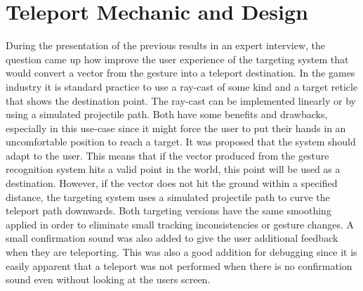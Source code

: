 
\section{Teleport Mechanic and Design}
During the presentation of the previous results in an expert interview, the question came up how improve the user experience of the targeting system that would convert a vector from the gesture into a teleport destination. In the games industry it is standard practice to use a ray-cast of some kind and a target reticle that shows the destination point. The ray-cast can be implemented linearly or by using a simulated projectile path. Both have some benefits and drawbacks, especially in this use-case since it might force the user to put their hands in an uncomfortable position to reach a target. It was proposed that the system should adapt to the user. This means that if the vector produced from the gesture recognition system hits a valid point in the world, this point will be used as a destination. However, if the vector does not hit the ground within a specified distance, the targeting system uses a simulated projectile path to curve the teleport path downwards. Both targeting versions have the same smoothing applied in order to eliminate small tracking inconsistencies or gesture changes. A small confirmation sound was also added to give the user additional feedback when they are teleporting. This was also a good addition for debugging since it is easily apparent that a teleport was not performed when there is no confirmation sound even without looking at the users screen.





